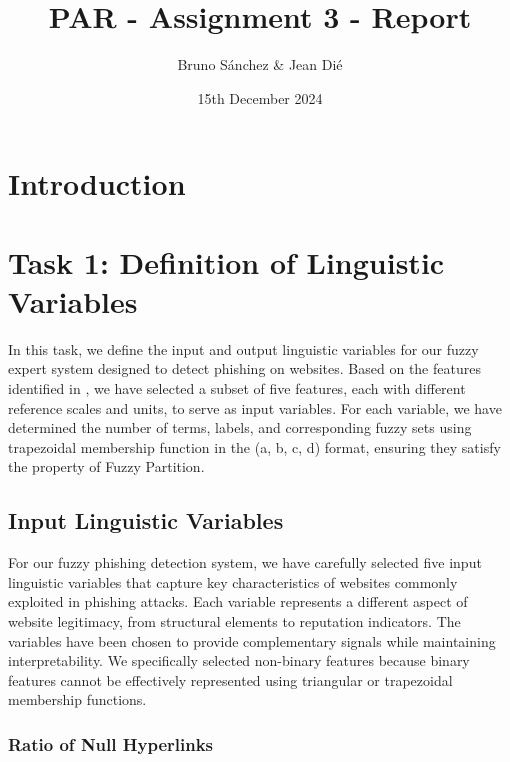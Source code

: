 \documentclass{article}
\begin{document}
\title{PAR - Assignment 3 - Report}
\author{\normalsize Bruno Sánchez \& Jean Dié}
\date{\small 15th December 2024}

\maketitle

\newpage
\tableofcontents
\newpage

\section{Introduction}


\section{Task 1: Definition of Linguistic Variables}

In this task, we define the input and output linguistic variables for our fuzzy expert system designed to detect phishing on websites. Based on the features identified in \cite{Hannousse2020-eq}, we have selected a subset of five features, each with different reference scales and units, to serve as input variables. For each variable, we have determined the number of terms, labels, and corresponding fuzzy sets using trapezoidal membership function in the (a, b, c, d) format, ensuring they satisfy the property of Fuzzy Partition.


\subsection{Input Linguistic Variables}

For our fuzzy phishing detection system, we have carefully selected five input linguistic variables that capture key characteristics of websites commonly exploited in phishing attacks. Each variable represents a different aspect of website legitimacy, from structural elements to reputation indicators. The variables have been chosen to provide complementary signals while maintaining interpretability. We specifically selected non-binary features because binary features cannot be effectively represented using triangular or trapezoidal membership functions.

\subsubsection{Ratio of Null Hyperlinks}
\end{document}
